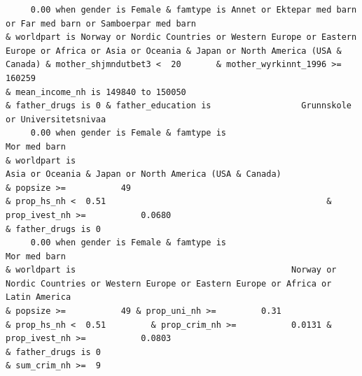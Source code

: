 \documentclass[
  letterpaper,
  DIV=11,
  numbers=noendperiod]{scrreprt}
\begin{document}
\begin{verbatim}
     0.00 when gender is Female & famtype is Annet or Ektepar med barn or Far med barn or Samboerpar med barn                                                                              & worldpart is Norway or Nordic Countries or Western Europe or Eastern Europe or Africa or Asia or Oceania & Japan or North America (USA & Canada) & mother_shjmndutbet3 <  20       & mother_wyrkinnt_1996 >=           160259                                                                             & mean_income_nh is 149840 to 150050                                                                                                                                                                                                                              & father_drugs is 0 & father_education is                  Grunnskole or Universitetsnivaa                    
     0.00 when gender is Female & famtype is                                                     Mor med barn                                                                              & worldpart is                                                                             Asia or Oceania & Japan or North America (USA & Canada)                                                                                                  & popsize >=           49                                                                    & prop_hs_nh <  0.51                                            & prop_ivest_nh >=           0.0680                                                                                                                          & father_drugs is 0                                                                                           
     0.00 when gender is Female & famtype is                                                     Mor med barn                                                                              & worldpart is                                           Norway or Nordic Countries or Western Europe or Eastern Europe or Africa or Latin America                                                                                                  & popsize >=           49 & prop_uni_nh >=         0.31                                      & prop_hs_nh <  0.51         & prop_crim_nh >=           0.0131 & prop_ivest_nh >=           0.0803                                                                                                                          & father_drugs is 0                                                                        & sum_crim_nh >=  9

\end{verbatim}
\end{document}
